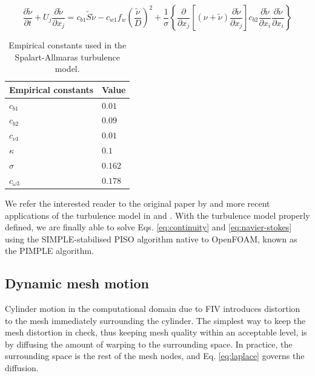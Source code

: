 \documentclass[a4paper,fleqn]{cas-sc}
\begin{document}
\begin{equation}
  \label{eq:kineticEddyTransport}
  \frac{\partial \tilde{\nu}}{\partial t} + U_{j} \frac{\partial \tilde{\nu}}{\partial x_{j}} = c_{b1}\tilde{S}\tilde{\nu} - c_{w1} f_{w} \left( \frac{\tilde{\nu}}{D} \right)^{2} + \frac{1}{\sigma} \left\{ \frac{\partial}{\partial x_{j}} \left[ \left( \nu + \tilde{\nu} \right) \frac{\partial \tilde{\nu}}{\partial x_{j}} \right] c_{b2} \frac{\partial \tilde{\nu}}{\partial x_{i}} \frac{\partial \tilde{\nu}}{\partial x_{i}} \right\}
\end{equation}

\begin{table}[width=0.6\textwidth,cols=2,pos=h]
  \caption{Empirical constants used in the Spalart-Allmaras turbulence model.} \label{tab:spalart-Allmaras}
  \begin{tabular*}{\tblwidth}{@{} LL@{} }
    \toprule
      Empirical constants & Value    \\
    \midrule
      $c_{b1}$            & $0.01$   \\
      $c_{b2}$            & $0.09$   \\
      $c_{\nu1}$          & $0.01$   \\
      $\kappa$            & $0.1$    \\
      $\sigma$            & $0.162$  \\
      $c_{\omega3}$       & $0.178$  \\
    \bottomrule
  \end{tabular*}
\end{table}

\noindent We refer the interested reader to the original paper by \citet{Spalart1992} and more recent applications of the turbulence model in \citet{Ding2019} and \citet{Sun2019b}. With the turbulence model properly defined, we are finally able to solve Eqs. \ref{eq:continuity} and \ref{eq:navier-stokes} using the SIMPLE-stabilised PISO algorithm native to OpenFOAM, known as the PIMPLE algorithm. 

\subsection{Dynamic mesh motion} \label{ssec:dynMesh}

Cylinder motion in the computational domain due to FIV introduces distortion to the mesh immediately surrounding the cylinder. The simplest way to keep the mesh distortion in check, thus keeping mesh quality within an acceptable level, is by diffusing the amount of warping to the surrounding space. In practice, the surrounding space is the rest of the mesh nodes, and Eq. \ref{eq:laplace} governs the diffusion.
\end{document}
